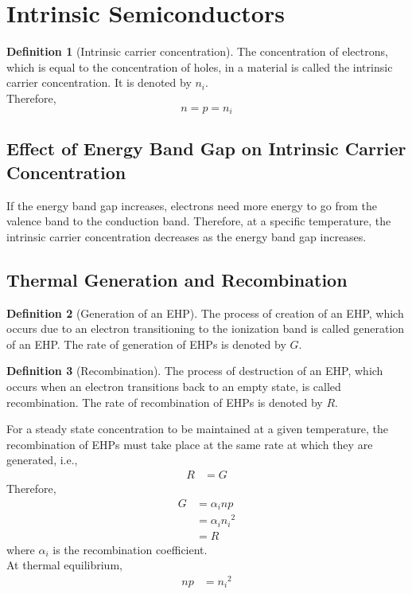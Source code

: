 \documentclass[titlepage, fleqn, a4paper, 12pt, twoside]{article}
\theoremstyle{definition}
\newtheorem{definition}{Definition}
\theoremstyle{theorem}
\begin{document}
\section{Intrinsic Semiconductors}

\begin{definition}[Intrinsic carrier concentration]
	The concentration of electrons, which is equal to the concentration of holes, in a material is called the intrinsic carrier concentration.
	It is denoted by $n_i$.\\
	Therefore,
	\begin{equation*}
		n = p = n_i
	\end{equation*}
\end{definition}

\subsection{Effect of Energy Band Gap on Intrinsic Carrier Concentration}

If the energy band gap increases, electrons need more energy to go from the valence band to the conduction band.
Therefore, at a specific temperature, the intrinsic carrier concentration decreases as the energy band gap increases.

\subsection{Thermal Generation and Recombination}

\begin{definition}[Generation of an EHP]
	The process of creation of an EHP, which occurs due to an electron transitioning to the ionization band is called generation of an EHP.
	The rate of generation of EHPs is denoted by $G$.
\end{definition}

\begin{definition}[Recombination]
	The process of destruction of an EHP, which occurs when an electron transitions back to an empty state, is called recombination.
	The rate of recombination of EHPs is denoted by $R$.
\end{definition}

For a steady state concentration to be maintained at a given temperature, the recombination of EHPs must take place at the same rate at which they are generated, i.e.,
\begin{align*}
	R &= G
\end{align*}
Therefore,
\begin{align*}
	G &= \alpha_i n p\\
	&= \alpha_i {n_i}^2\\
	&= R
\end{align*}
where $\alpha_i$ is the recombination coefficient.\\
At thermal equilibrium,
\begin{align*}
	n p &= {n_i}^2
\end{align*}
\end{document}
